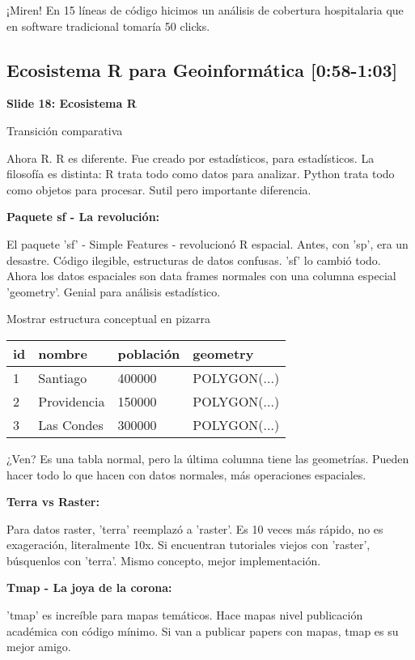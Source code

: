 \documentclass[11pt,a4paper]{article}
\newcommand{\tiempo}[1]{\textcolor{timecolor}{\faIcon{clock} \textbf{[#1]}}}
\newcommand{\decir}[1]{\begin{tcolorbox}[colback=blue!5,colframe=usachblue,title={\faIcon{microphone} DECIR}]#1\end{tcolorbox}}
\newcommand{\hacer}[1]{\begin{tcolorbox}[colback=green!5,colframe=green!50!black,title={\faIcon{hand-point-right} HACER}]#1\end{tcolorbox}}
\begin{document}
\decir{¡Miren! En 15 líneas de código hicimos un análisis de cobertura hospitalaria que en software tradicional tomaría 50 clicks.}

\subsection{Ecosistema R para Geoinformática \tiempo{0:58-1:03}}

\textbf{Slide 18: Ecosistema R}

\hacer{Transición comparativa}

\decir{Ahora R. R es diferente. Fue creado por estadísticos, para estadísticos. La filosofía es distinta: R trata todo como datos para analizar. Python trata todo como objetos para procesar. Sutil pero importante diferencia.}

\textbf{Paquete sf - La revolución:}

\decir{El paquete 'sf' - Simple Features - revolucionó R espacial. Antes, con 'sp', era un desastre. Código ilegible, estructuras de datos confusas. 'sf' lo cambió todo. Ahora los datos espaciales son data frames normales con una columna especial 'geometry'. Genial para análisis estadístico.}

\hacer{Mostrar estructura conceptual en pizarra}

\begin{center}
\begin{tabular}{|l|l|l|l|}
\hline
id & nombre & población & geometry \\
\hline
1 & Santiago & 400000 & POLYGON(...) \\
2 & Providencia & 150000 & POLYGON(...) \\
3 & Las Condes & 300000 & POLYGON(...) \\
\hline
\end{tabular}
\end{center}

\decir{¿Ven? Es una tabla normal, pero la última columna tiene las geometrías. Pueden hacer todo lo que hacen con datos normales, más operaciones espaciales.}

\textbf{Terra vs Raster:}

\decir{Para datos raster, 'terra' reemplazó a 'raster'. Es 10 veces más rápido, no es exageración, literalmente 10x. Si encuentran tutoriales viejos con 'raster', búsquenlos con 'terra'. Mismo concepto, mejor implementación.}

\textbf{Tmap - La joya de la corona:}

\decir{'tmap' es increíble para mapas temáticos. Hace mapas nivel publicación académica con código mínimo. Si van a publicar papers con mapas, tmap es su mejor amigo.}
\end{document}
